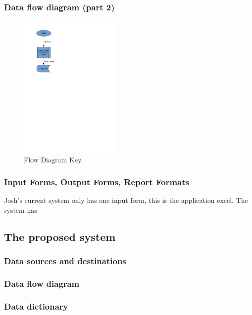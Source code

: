 \documentclass[12pt]{report}
\begin{document}
\newpage

\subsubsection{Data flow diagram (part 2)}

\begin{figure}[H]
    \caption{Flow Diagram Key.} \label{fig:print_function_result}
    \includegraphics[width=50mm,scale=0.5]{./DFD_analysis_update_item.pdf}
\end{figure}

\newpage

\subsubsection{Input Forms, Output Forms, Report Formats}

Josh's current system only has one input form, this is the application excel. The system has 

\subsection{The proposed system}

\subsubsection{Data sources and destinations}

\subsubsection{Data flow diagram}

\subsubsection{Data dictionary}
\end{document}
